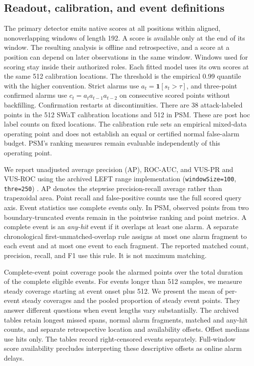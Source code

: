 \documentclass[pdflatex,sn-apa]{sn-jnl}
\begin{document}
\subsection{Readout, calibration, and event
definitions}\label{readout-calibration-and-event-definitions}

The primary detector emits native scores at all positions within
aligned, nonoverlapping windows of length 192. A score is available only
at the end of its window. The resulting analysis is offline and
retrospective, and a score at a position can depend on later
observations in the same window. Windows used for scoring stay inside
their authorized roles. Each fitted model uses its own scores at the
same 512 calibration locations. The threshold is the empirical 0.99
quantile with the higher convention. Strict alarms use
\(a_t=\mathbf{1}[s_t>\tau]\), and three-point confirmed alarms use
\(c_t=a_t a_{t-1}a_{t-2}\) on consecutive scored points without
backfilling. Confirmation restarts at discontinuities. There are 38
attack-labeled points in the 512 SWaT calibration locations and 512 in
PSM. These are post hoc label counts on fixed locations. The calibration
rule sets an empirical mixed-data operating point and does not establish
an equal or certified normal false-alarm budget. PSM's ranking measures
remain evaluable independently of this operating point.

We report unadjusted average precision (AP), ROC-AUC, and VUS-PR and
VUS-ROC using the archived LEFT range implementation
(\texttt{windowSize=100}, \texttt{thre=250}) \citep{vus2025}. AP denotes
the stepwise precision-recall average rather than trapezoidal area.
Point recall and false-positive counts use the full scored query axis.
Event statistics use complete events only. In PSM, observed points from
two boundary-truncated events remain in the pointwise ranking and point
metrics. A complete event is an \emph{any-hit} event if it overlaps at
least one alarm. A separate chronological first-unmatched-overlap rule
assigns at most one alarm fragment to each event and at most one event
to each fragment. The reported matched count, precision, recall, and F1
use this rule. It is not maximum matching.

Complete-event point coverage pools the alarmed points over the total
duration of the complete eligible events. For events longer than 512
samples, we measure steady coverage starting at event onset plus 512. We
present the mean of per-event steady coverages and the pooled proportion
of steady event points. They answer different questions when event
lengths vary substantially. The archived tables retain longest missed
spans, normal alarm fragments, matched and any-hit counts, and separate
retrospective location and availability offsets. Offset medians use hits
only. The tables record right-censored events separately. Full-window
score availability precludes interpreting these descriptive offsets as
online alarm delays.
\end{document}
